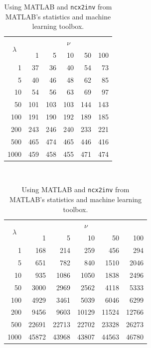 \documentclass[11pt,a4paper,twoside,english]{extarticle}
\begin{document}
\begin{table}[htb]
    \centering
    \noindent
    \begin{subtable}[t]{0.35\linewidth}
    \centering    
    \begin{tabular}{|r|rrrrr|}
    \multicolumn{1}{c}{\multirow{2}{*}{$ \lambda $}} & \multicolumn{5}{c}{$ \nu $} \\
    \cline{2-6}
    \multicolumn{1}{c|}{} & 1 &   5  &  10 &  50  & 100 \\
    \hline
    1    &  37 &  36 &  40 &  54 &  73\\
    5    &  40 &  46 &  48 &  62 &  85\\
    10   &  54 &  56 &  63 &  69 &  97\\
    50   & 101 & 103 & 103 & 144 & 143\\
    100  & 191 & 190 & 192 & 189 & 185\\
    200  & 243 & 246 & 240 & 233 & 221\\
    500  & 465 & 474 & 465 & 446 & 416\\
    1000 & 459 & 458 & 455 & 471 & 474 \\
    \hline
\end{tabular}\\[1em]
\begin{minipage}[t]{0.9\linewidth}
\caption{Using Python and \texttt{ncx2.ppf} from Scipy's \texttt{scipy.stats}.}
\label{tab:non_central_chi_2_times_python}
\end{minipage}
\end{subtable}
\hfill
\begin{subtable}[t]{0.5\linewidth}   
    \centering     
    \begin{tabular}{|r|rrrrr|}
    \multicolumn{1}{c}{\multirow{2}{*}{$ \lambda $}} & \multicolumn{5}{c}{$ \nu $} \\
    \cline{2-6}
    \multicolumn{1}{c|}{} & 1 &   5  &  10 &  50  & 100 \\
    \hline
    1& 168 & 214 & 259 & 456 & 294  \\ 
    5& 651 & 782 & 840 & 1510 & 2046  \\ 
    10& 935 & 1086 & 1050 & 1838 & 2496  \\ 
    50& 3000 & 2969 & 2562 & 4118 & 5333  \\ 
    100& 4929 & 3461 & 5039 & 6046 & 6299  \\ 
    200& 9456 & 9603 & 10129 & 11524 & 12766  \\ 
    500& 22691 & 22713 & 22702 & 23328 & 26273  \\ 
    1000& 45872 & 43968 & 43807 & 44563 & 46780  \\
    \hline
\end{tabular}\\[1em]
\begin{minipage}[t]{0.9\linewidth}
    \caption{Using MATLAB and \texttt{ncx2inv} from MATLAB's statistics and machine learning toolbox.}
    \label{tab:non_central_chi_2_times_matlab}
\end{minipage}
\end{subtable}



\end{table}
\end{document}
